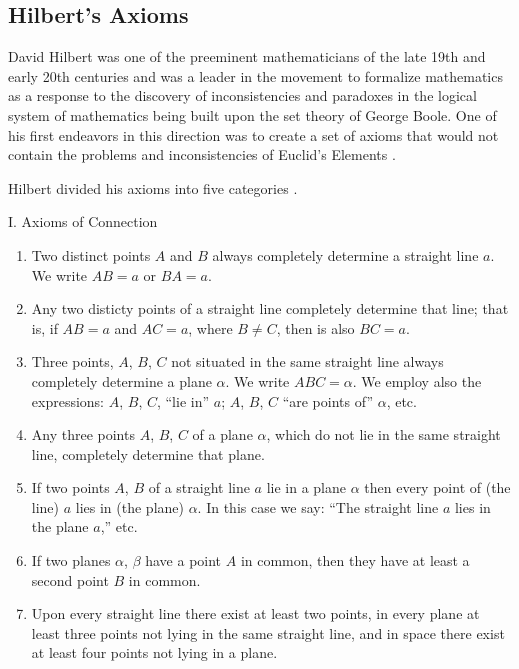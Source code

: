 \documentclass[
]{book}
\theoremstyle{definition}
\theoremstyle{definition}
\theoremstyle{definition}
\theoremstyle{definition}
\theoremstyle{remark}
\begin{document}
\hypertarget{hilberts-axioms}{%
\subsection{Hilbert's Axioms}\label{hilberts-axioms}}

David Hilbert was one of the preeminent mathematicians of the late 19th and early 20th centuries and was a leader in the movement to formalize mathematics as a response to the discovery of inconsistencies and paradoxes in the logical system of mathematics being built upon the set theory of George Boole. One of his first endeavors in this direction was to create a set of axioms that would not contain the problems and inconsistencies of Euclid's Elements \citep{HilbertGeo}.

Hilbert divided his axioms into five categories \citep[p.~3-26]{HilbertGeo}.

I. Axioms of Connection

\begin{enumerate}
\def\labelenumi{\arabic{enumi}.}
\item
  Two distinct points \(A\) and \(B\) always completely determine a straight line \(a\). We write \(AB=a\) or \(BA=a\).
\item
  Any two disticty points of a straight line completely determine that line; that is, if \(AB=a\) and \(AC=a\), where \(B\neq C\), then is also \(BC=a\).
\item
  Three points, \(A\), \(B\), \(C\) not situated in the same straight line always completely determine a plane \(\alpha\). We write \(ABC = \alpha\).
  We employ also the expressions: \(A\), \(B\), \(C\), ``lie in'' \(a\); \(A\), \(B\), \(C\) ``are points of'' \(\alpha\), etc.
\item
  Any three points \(A\), \(B\), \(C\) of a plane \(\alpha\), which do not lie in the same straight line, completely determine that plane.
\item
  If two points \(A\), \(B\) of a straight line \(a\) lie in a plane \(\alpha\) then every point of (the line) \(a\) lies in (the plane) \(\alpha\).
  In this case we say: ``The straight line \(a\) lies in the plane \(a\),'' etc.
\item
  If two planes \(\alpha\), \(\beta\) have a point \(A\) in common, then they have at least a second point \(B\) in common.
\item
  Upon every straight line there exist at least two points, in every plane at least three points not lying in the same straight line, and in space there exist at least four points not lying in a plane.
\end{enumerate}
\end{document}
